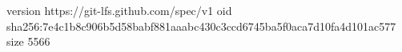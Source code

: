 version https://git-lfs.github.com/spec/v1
oid sha256:7e4c1b8c906b5d58babf881aaabc430c3ccd6745ba5f0aca7d10fa4d101ac577
size 5566
